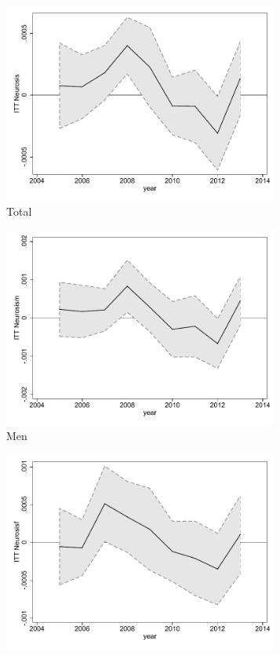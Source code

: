 \documentclass[a4paper ]{article}
\begin{document}
\begin{figure}[h!]
	\centering
	\begin{subfigure}[t]{0.31\textwidth}
		\centering
		\includegraphics[width=0.99\textwidth]{R1_LC_Neurosis}
		\caption{Total}		
	\end{subfigure}
	\begin{subfigure}[t]{0.31\textwidth}
		\centering
		\includegraphics[width=0.99\textwidth]{R1_LC_Neurosism}
		\caption{Men}		
	\end{subfigure}
	\quad
	\begin{subfigure}[t]{0.31\textwidth}
		\centering
		\includegraphics[width=0.99\textwidth]{R1_LC_Neurosisf}

\end{subfigure}
\end{figure}
\end{document}
